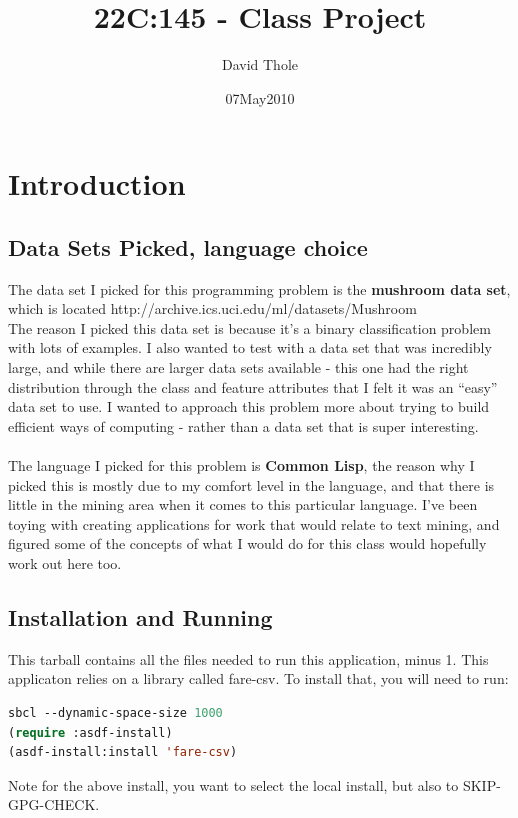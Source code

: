 \documentclass{article}
\begin{document}
\title{22C:145 - Class Project}
\author{David Thole}
\date{07May2010}

\thispagestyle{plain}           %
\tableofcontents
{} %
\cleardoublepage                %

\section{Introduction}
\subsection{Data Sets Picked, language choice}
The data set I picked for this programming problem is the \textbf{mushroom data set}, which is located http://archive.ics.uci.edu/ml/datasets/Mushroom \\
The reason I picked this data set is because it's a binary classification problem with lots of examples.  I also wanted to test with a data set that was incredibly large, and while there are larger data sets available - this one had the right distribution through the class and feature attributes that I felt it was an ``easy'' data set to use.  I wanted to approach this problem more about trying to build efficient ways of computing - rather than a data set that is super interesting. \\
\\
The language I picked for this problem is \textbf{Common Lisp}, the reason why I picked this is mostly due to my comfort level in the language, and that there is little in the mining area when it comes to this particular language.  I've been toying with creating applications for work that would relate to text mining, and figured some of the concepts of what I would do for this class would hopefully work out here too.

\subsection{Installation and Running}
This tarball contains all the files needed to run this application, minus 1.  This applicaton relies on a library called fare-csv.  To install that, you will need to run:

\begin{lstlisting}[frame=single,language=lisp]
sbcl --dynamic-space-size 1000
(require :asdf-install)
(asdf-install:install 'fare-csv)
\end{lstlisting}
Note for the above install, you want to select the local install, but also to SKIP-GPG-CHECK.
\end{document}
